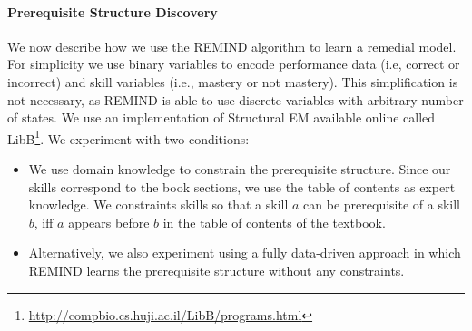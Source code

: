 \documentclass{edm_template}
\begin{document}
{	
	\paragraph{Prerequisite Structure Discovery}
	\label{sec:prerequisite_results}
	We now describe how we use the REMIND algorithm to learn a remedial model.
	For simplicity we use binary variables to encode  performance data (i.e, correct or incorrect) and skill variables  (i.e., mastery or not mastery).
	This simplification is not necessary,  as REMIND is able to use  discrete variables with arbitrary number of states.
	We use an implementation of Structural EM available online called LibB\footnote{\url{http://compbio.cs.huji.ac.il/LibB/programs.html}}.
	We experiment with two conditions:
	\begin{itemize}[noitemsep,topsep=2pt,parsep=0pt,partopsep=0pt]
		\item We use domain knowledge to constrain the prerequisite structure.
		Since our skills correspond to the book sections, we use  the table of contents as expert knowledge.
		We constraints skills so that a skill $a$ can be prerequisite of a skill $b$, iff $a$ appears before $b$ in the table of contents of the textbook.
		\item Alternatively, we also experiment using a fully data-driven approach in which REMIND learns the prerequisite structure without any constraints.
	\end{itemize} 
	
}
\end{document}
